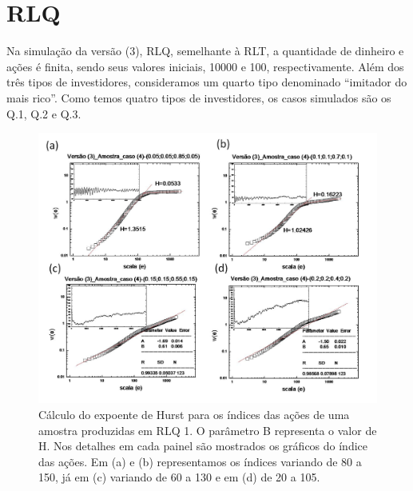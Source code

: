 \documentclass[brazil,ruledheader]{abnt}
\begin{document}
\section{RLQ}

Na simulação da versão (3), RLQ, semelhante à RLT, a quantidade
de dinheiro e ações é finita, sendo seus valores iniciais, 10000 e 100,
respectivamente. Além dos três tipos de investidores, consideramos um quarto
tipo denominado “imitador do mais rico”.  Como temos quatro tipos de
investidores, os casos simulados são os Q.1, Q.2 e Q.3.

\begin{figure}[!h]
\centering
\includegraphics[width=0.8\linewidth]{Figuras/19.jpg}
\caption [Cálculo do expoente de Hurst para os índices em RLQ 1]{Cálculo do
expoente de Hurst para os índices das ações de uma amostra produzidas em RLQ 1.
O parâmetro B representa o valor de H.
Nos detalhes em cada painel são mostrados os gráficos do índice das ações. Em
(a) e (b) representamos os índices variando de 80 a 150, já em (c) variando de
60 a 130 e em (d) de 20 a 105. }
\label{fig:calculo-expoente-hurst7}
\end{figure}
\end{document}
